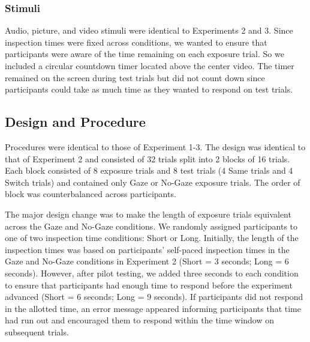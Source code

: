 \documentclass[oneside]{report}
\begin{document}
\subsubsection{Stimuli}\label{stimuli-3}

Audio, picture, and video stimuli were identical to Experiments 2 and 3.
Since inspection times were fixed across conditions, we wanted to ensure
that participants were aware of the time remaining on each exposure
trial. So we included a circular countdown timer located above the
center video. The timer remained on the screen during test trials but
did not count down since participants could take as much time as they
wanted to respond on test trials.

\subsection{Design and Procedure}\label{design-and-procedure-3}

Procedures were identical to those of Experiment 1-3. The design was
identical to that of Experiment 2 and consisted of 32 trials split into
2 blocks of 16 trials. Each block consisted of 8 exposure trials and 8
test trials (4 Same trials and 4 Switch trials) and contained only Gaze
or No-Gaze exposure trials. The order of block was counterbalanced
across participants.

The major design change was to make the length of exposure trials
equivalent across the Gaze and No-Gaze conditions. We randomly assigned
participants to one of two inspection time conditions: Short or Long.
Initially, the length of the inspection times was based on participants'
self-paced inspection times in the Gaze and No-Gaze conditions in
Experiment 2 (Short = 3 seconds; Long = 6 seconds). However, after pilot
testing, we added three seconds to each condition to ensure that
participants had enough time to respond before the experiment advanced
(Short = 6 seconds; Long = 9 seconds). If participants did not respond
in the allotted time, an error message appeared informing participants
that time had run out and encouraged them to respond within the time
window on subsequent trials.
\end{document}
